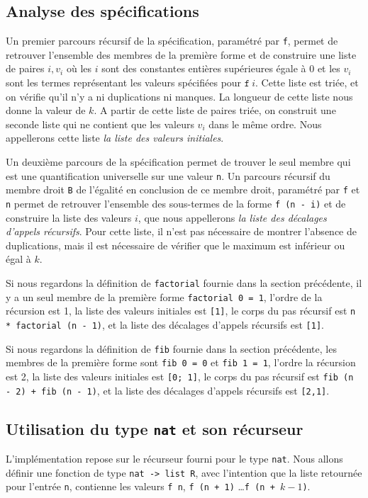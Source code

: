 \documentclass[draft]{jflart}
\begin{document}
\subsection{Analyse des spécifications}
Un premier parcours récursif de la spécification, paramétré par
\texttt{f}, permet de retrouver l'ensemble des membres de la première forme
et de construire une liste de paires \(i, v_i\) où les \(i\) sont des
constantes entières supérieures égale à 0 et les \(v_i\) sont les
termes représentant les valeurs spécifiées pour \(\texttt{f}~i\).  Cette
liste est triée, et on vérifie qu'il n'y a ni duplications ni manques.
La longueur de cette liste nous donne la valeur de \(k\).  A partir
de cette liste de paires triée, on construit une seconde liste qui ne
contient que les valeurs \(v_i\) dans le même ordre.  Nous appellerons
cette liste {\em la liste des valeurs initiales}.

Un deuxième parcours de la spécification permet de trouver le seul
membre qui est une quantification universelle sur une valeur \texttt{n}.
Un parcours récursif du membre droit \texttt{B} de l'égalité en conclusion de
ce membre droit, paramétré par \texttt{f} et \texttt{n}  permet de retrouver
l'ensemble des sous-termes de la forme \texttt{f (n - i)} et de
construire la liste des valeurs \(i\), que nous appellerons {\em la liste des
décalages d'appels récursifs}.  Pour cette liste, il n'est
pas nécessaire de montrer l'absence de duplications, mais il est
nécessaire de vérifier que le maximum est inférieur ou égal à \(k\).

Si nous regardons la définition de \texttt{factorial} fournie dans la
section précédente, il y a un seul membre de la première forme
\texttt{factorial 0 = 1}, l'ordre de la récursion est 1,
la liste des valeurs initiales est \texttt{[1]}, le
corps du pas récursif est \texttt{n * factorial (n - 1)}, et la liste
des décalages d'appels récursifs est \texttt{[1]}.

Si nous regardons la définition de \texttt{fib} fournie dans la section
précédente, les membres de la première forme sont \texttt{fib 0 = 0} et
\texttt{fib 1 = 1}, l'ordre la récursion est 2,
la liste des valeurs initiales est \texttt{[0; 1]},
le corps du pas récursif est \texttt{fib (n - 2) + fib (n - 1)}, et
la liste des décalages d'appels récursifs est \texttt{[2,1]}.

\subsection{Utilisation du type \texttt{nat} et son récurseur}
L'implémentation repose sur le récurseur fourni pour le type
\texttt{nat}.  Nous allons définir une fonction de type \texttt{nat -> list
  R}, avec l'intention que la liste retournée pour l'entrée \texttt{n},
contienne les valeurs \texttt{f n}, \texttt{f (n + 1)} \dots \texttt{f (n + \(k -
  1\))}.
\end{document}
